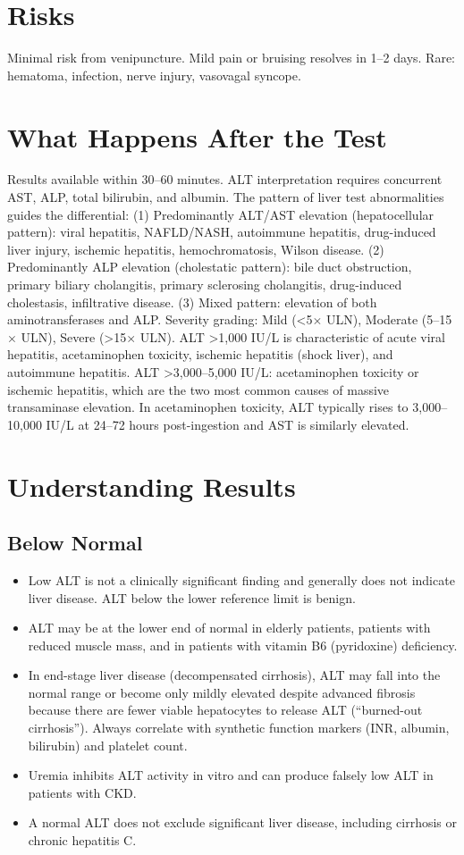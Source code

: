 \section*{Risks}
Minimal risk from venipuncture. Mild pain or bruising resolves in 1--2 days. Rare: hematoma, infection, nerve injury, vasovagal syncope.

\section*{What Happens After the Test}
Results available within 30--60 minutes. ALT interpretation requires concurrent AST, ALP, total bilirubin, and albumin. The pattern of liver test abnormalities guides the differential: (1) Predominantly ALT/AST elevation (hepatocellular pattern): viral hepatitis, NAFLD/NASH, autoimmune hepatitis, drug-induced liver injury, ischemic hepatitis, hemochromatosis, Wilson disease. (2) Predominantly ALP elevation (cholestatic pattern): bile duct obstruction, primary biliary cholangitis, primary sclerosing cholangitis, drug-induced cholestasis, infiltrative disease. (3) Mixed pattern: elevation of both aminotransferases and ALP. Severity grading: Mild (<5$\times$ ULN), Moderate (5--15$\times$ ULN), Severe (>15$\times$ ULN). ALT >1,000 IU/L is characteristic of acute viral hepatitis, acetaminophen toxicity, ischemic hepatitis (shock liver), and autoimmune hepatitis. ALT >3,000--5,000 IU/L: acetaminophen toxicity or ischemic hepatitis, which are the two most common causes of massive transaminase elevation. In acetaminophen toxicity, ALT typically rises to 3,000--10,000 IU/L at 24--72 hours post-ingestion and AST is similarly elevated.

\section*{Understanding Results}

\subsection*{Below Normal}
\begin{itemize}
  \item Low ALT is not a clinically significant finding and generally does not indicate liver disease. ALT below the lower reference limit is benign.
  \item ALT may be at the lower end of normal in elderly patients, patients with reduced muscle mass, and in patients with vitamin B6 (pyridoxine) deficiency.
  \item In end-stage liver disease (decompensated cirrhosis), ALT may fall into the normal range or become only mildly elevated despite advanced fibrosis because there are fewer viable hepatocytes to release ALT (``burned-out cirrhosis''). Always correlate with synthetic function markers (INR, albumin, bilirubin) and platelet count.
  \item Uremia inhibits ALT activity in vitro and can produce falsely low ALT in patients with CKD.
  \item A normal ALT does not exclude significant liver disease, including cirrhosis or chronic hepatitis C.
\end{itemize}


